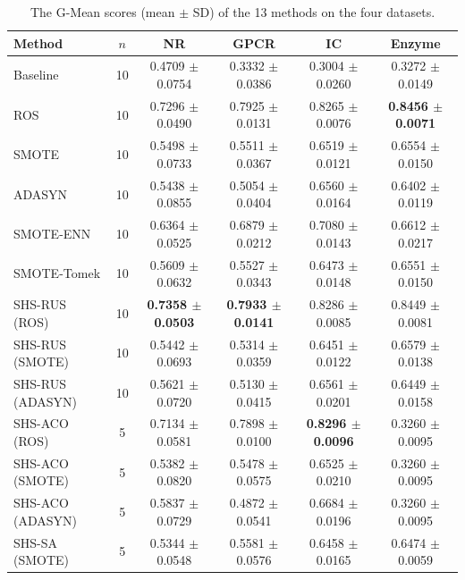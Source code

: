 \documentclass[pdflatex,sn-basic]{sn-jnl}
\begin{document}
\begin{appendices}
\begin{table}[htbp]
\centering
\caption{The G-Mean scores (mean $\pm$ SD) of the 13 methods on the four datasets.}
\label{tab:sgmean}
\setlength{\tabcolsep}{3pt}%
\footnotesize
\begin{tabular}{lccccc}
\toprule
Method & $n$ & NR & GPCR & IC & Enzyme \\
\midrule
Baseline & 10 & 0.4709 $\pm$ 0.0754 & 0.3332 $\pm$ 0.0386 & 0.3004 $\pm$ 0.0260 & 0.3272 $\pm$ 0.0149 \\
ROS & 10 & 0.7296 $\pm$ 0.0490 & 0.7925 $\pm$ 0.0131 & 0.8265 $\pm$ 0.0076 & \textbf{0.8456 $\pm$ 0.0071} \\
SMOTE & 10 & 0.5498 $\pm$ 0.0733 & 0.5511 $\pm$ 0.0367 & 0.6519 $\pm$ 0.0121 & 0.6554 $\pm$ 0.0150 \\
ADASYN & 10 & 0.5438 $\pm$ 0.0855 & 0.5054 $\pm$ 0.0404 & 0.6560 $\pm$ 0.0164 & 0.6402 $\pm$ 0.0119 \\
SMOTE-ENN & 10 & 0.6364 $\pm$ 0.0525 & 0.6879 $\pm$ 0.0212 & 0.7080 $\pm$ 0.0143 & 0.6612 $\pm$ 0.0217 \\
SMOTE-Tomek & 10 & 0.5609 $\pm$ 0.0632 & 0.5527 $\pm$ 0.0343 & 0.6473 $\pm$ 0.0148 & 0.6551 $\pm$ 0.0150 \\
SHS-RUS (ROS) & 10 & \textbf{0.7358 $\pm$ 0.0503} & \textbf{0.7933 $\pm$ 0.0141} & 0.8286 $\pm$ 0.0085 & 0.8449 $\pm$ 0.0081 \\
SHS-RUS (SMOTE) & 10 & 0.5442 $\pm$ 0.0693 & 0.5314 $\pm$ 0.0359 & 0.6451 $\pm$ 0.0122 & 0.6579 $\pm$ 0.0138 \\
SHS-RUS (ADASYN) & 10 & 0.5621 $\pm$ 0.0720 & 0.5130 $\pm$ 0.0415 & 0.6561 $\pm$ 0.0201 & 0.6449 $\pm$ 0.0158 \\
SHS-ACO (ROS) & 5 & 0.7134 $\pm$ 0.0581 & 0.7898 $\pm$ 0.0100 & \textbf{0.8296 $\pm$ 0.0096} & 0.3260 $\pm$ 0.0095 \\
SHS-ACO (SMOTE) & 5 & 0.5382 $\pm$ 0.0820 & 0.5478 $\pm$ 0.0575 & 0.6525 $\pm$ 0.0210 & 0.3260 $\pm$ 0.0095 \\
SHS-ACO (ADASYN) & 5 & 0.5837 $\pm$ 0.0729 & 0.4872 $\pm$ 0.0541 & 0.6684 $\pm$ 0.0196 & 0.3260 $\pm$ 0.0095 \\
SHS-SA (SMOTE) & 5 & 0.5344 $\pm$ 0.0548 & 0.5581 $\pm$ 0.0576 & 0.6458 $\pm$ 0.0165 & 0.6474 $\pm$ 0.0059 \\
\bottomrule
\end{tabular}
\end{table}


\end{appendices}
\end{document}
